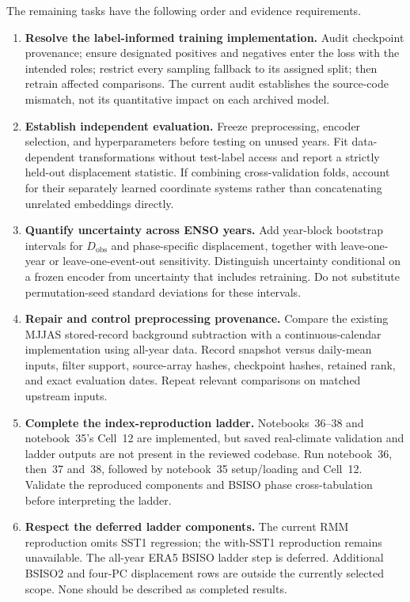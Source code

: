\documentclass[11pt]{article}
\begin{document}
The remaining tasks have the following order and evidence requirements.
\begin{enumerate}
\item \textbf{Resolve the label-informed training implementation.} Audit checkpoint provenance; ensure designated positives and negatives enter the loss with the intended roles; restrict every sampling fallback to its assigned split; then retrain affected comparisons. The current audit establishes the source-code mismatch, not its quantitative impact on each archived model.
\item \textbf{Establish independent evaluation.} Freeze preprocessing, encoder selection, and hyperparameters before testing on unused years. Fit data-dependent transformations without test-label access and report a strictly held-out displacement statistic. If combining cross-validation folds, account for their separately learned coordinate systems rather than concatenating unrelated embeddings directly.
\item \textbf{Quantify uncertainty across ENSO years.} Add year-block bootstrap intervals for $D_{\mathrm{obs}}$ and phase-specific displacement, together with leave-one-year or leave-one-event-out sensitivity. Distinguish uncertainty conditional on a frozen encoder from uncertainty that includes retraining. Do not substitute permutation-seed standard deviations for these intervals.
\item \textbf{Repair and control preprocessing provenance.} Compare the existing MJJAS stored-record background subtraction with a continuous-calendar implementation using all-year data. Record snapshot versus daily-mean inputs, filter support, source-array hashes, checkpoint hashes, retained rank, and exact evaluation dates. Repeat relevant comparisons on matched upstream inputs.
\item \textbf{Complete the index-reproduction ladder.} Notebooks~36--38 and notebook~35's Cell~12 are implemented, but saved real-climate validation and ladder outputs are not present in the reviewed codebase. Run notebook~36, then~37 and~38, followed by notebook~35 setup/loading and Cell~12. Validate the reproduced components and BSISO phase cross-tabulation before interpreting the ladder.
\item \textbf{Respect the deferred ladder components.} The current RMM reproduction omits SST1 regression; the with-SST1 reproduction remains unavailable. The all-year ERA5 BSISO ladder step is deferred. Additional BSISO2 and four-PC displacement rows are outside the currently selected scope. None should be described as completed results.

\end{enumerate}
\end{document}
